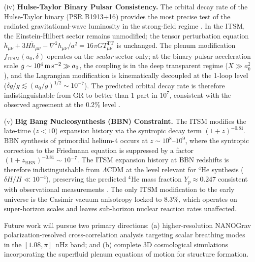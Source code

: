 \documentclass[aps,prd,10pt,twocolumn,superscriptaddress,nofootinbib,floatfix]{revtex4-2}
\begin{document}
(iv) \textbf{Hulse-Taylor Binary Pulsar Consistency.} The orbital decay rate of the Hulse-Taylor binary (PSR B1913+16) provides the most precise test of the radiated gravitational-wave luminosity in the strong-field regime \cite{weisberg_taylor}. In the ITSM, the Einstein-Hilbert sector remains unmodified; the tensor perturbation equation $\ddot{h}_{\mu\nu} + 3H\dot{h}_{\mu\nu} - \nabla^2 h_{\mu\nu}/a^2 = 16\pi G T_{\mu\nu}^{\text{TT}}$ is unchanged. The plenum modification $f_{\text{ITSM}}(a_0, \delta)$ operates on the \emph{scalar} sector only; at the binary pulsar acceleration scale $g \sim 10^{4}\,\text{m\,s}^{-2} \gg a_0$, the coupling is in the deep transparent regime ($X \gg a_0^2$), and the Lagrangian modification is kinematically decoupled at the 1-loop level ($\delta g / g \lesssim (a_0/g)^{1/2} \sim 10^{-7}$). The predicted orbital decay rate is therefore indistinguishable from GR to better than 1 part in $10^7$, consistent with the observed agreement at the $0.2\%$ level \cite{weisberg_taylor}.

(v) \textbf{Big Bang Nucleosynthesis (BBN) Constraint.} The ITSM modifies the late-time ($z < 10$) expansion history via the syntropic decay term $(1+z)^{-0.81}$. BBN synthesis of primordial helium-4 occurs at $z \sim 10^8$--$10^9$, where the syntropic correction to the Friedmann equation is suppressed by a factor $(1+z_\text{BBN})^{-0.81} \sim 10^{-7}$. The ITSM expansion history at BBN redshifts is therefore indistinguishable from $\Lambda$CDM at the level relevant for $^4$He synthesis ($\delta H / H \ll 10^{-4}$), preserving the predicted $^4$He mass fraction $Y_p \approx 0.247$ consistent with observational measurements \cite{planck}. The only ITSM modification to the early universe is the Casimir vacuum anisotropy locked to $8.3\%$, which operates on super-horizon scales and leaves sub-horizon nuclear reaction rates unaffected.

Future work will pursue two primary directions: (a) higher-resolution NANOGrav polarization-resolved cross-correlation analysis targeting scalar breathing modes in the $[1.08, \pi]$~nHz band; and (b) complete 3D cosmological simulations incorporating the superfluid plenum equations of motion for structure formation.
\end{document}
